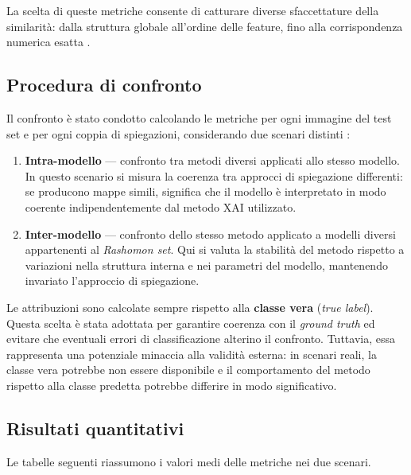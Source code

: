 \documentclass{article}
\begin{document}
La scelta di queste metriche consente di catturare diverse sfaccettature della
similarità: dalla struttura globale all’ordine delle feature, fino alla
corrispondenza numerica esatta \citep{leventi2023consistency,
      samek2016evaluating}.

\subsection{Procedura di confronto}
Il confronto è stato condotto calcolando le metriche per ogni immagine del test
set e per ogni coppia di spiegazioni, considerando due scenari distinti
\citep{bhatt2021evaluating, mueller2023rashomon, leventi2023consistency,
      krishna2022disagreement}:

\begin{enumerate}
      \item \textbf{Intra-modello} — confronto tra metodi diversi applicati allo stesso modello.
            In questo scenario si misura la coerenza tra approcci di spiegazione differenti:
            se producono mappe simili, significa che il modello è interpretato in modo coerente
            indipendentemente dal metodo XAI utilizzato.

      \item \textbf{Inter-modello} — confronto dello stesso metodo applicato a modelli diversi
            appartenenti al \emph{Rashomon set}.
            Qui si valuta la stabilità del metodo rispetto a variazioni nella struttura interna
            e nei parametri del modello, mantenendo invariato l’approccio di spiegazione.
\end{enumerate}

Le attribuzioni sono calcolate sempre rispetto alla \textbf{classe vera}
(\textit{true label}). Questa scelta è stata adottata per garantire coerenza
con il \emph{ground truth} ed evitare che eventuali errori di classificazione
alterino il confronto. Tuttavia, essa rappresenta una potenziale minaccia alla
validità esterna: in scenari reali, la classe vera potrebbe non essere
disponibile e il comportamento del metodo rispetto alla classe predetta
potrebbe differire in modo significativo.

\subsection{Risultati quantitativi}
Le tabelle seguenti riassumono i valori medi delle metriche nei due scenari.
\end{document}
